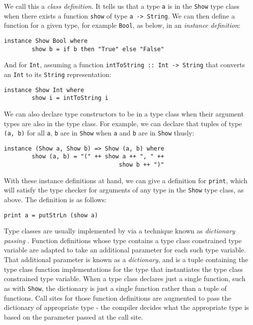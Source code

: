 \noindent We call this a \emph{class definition}. It tells us that a type
\texttt{a} is in the \texttt{Show} type class when there exists a function
\texttt{show} of type \texttt{a -> String}. We can then define a function for a
given type, for example \texttt{Bool}, as below, in an \emph{instance
definition}:
\begin{lstlisting}[mathescape]
    instance Show Bool where
        show b = if b then "True" else "False"
\end{lstlisting}

\noindent And for \texttt{Int}, assuming a function \texttt{intToString :: Int
-> String} that converts an \texttt{Int} to its \texttt{String} representation:
\begin{lstlisting}[mathescape]
    instance Show Int where
        show i = intToString i
\end{lstlisting}

\noindent We can also declare type constructors to be in a type class when their
argument types are also in the type class. For example, we can declare that
tuples of type \texttt{(a, b)} for all \texttt{a}, \texttt{b} are in
\texttt{Show} when \texttt{a} and \texttt{b} are in \texttt{Show} thusly:
\begin{lstlisting}[mathescape]
    instance (Show a, Show b) => Show (a, b) where
        show (a, b) = "(" ++ show a ++ ", " ++
                                 show b ++ ")"
\end{lstlisting}

\noindent With these instance definitions at hand, we can give a definition for
\texttt{print}, which will satisfy the type checker for arguments of any type in
the \texttt{Show} type class, as above. The definition is as follows:
\begin{lstlisting}[mathescape]
    print a = putStrLn (show a)
\end{lstlisting}

Type classes are usually implemented by via a technique known as
\emph{dictionary passing} \cite{K14}. Function definitions whose type contains
a type class constrained type variable are adapted to take an additional
parameter for each such type variable. That additional parameter is known as a
\emph{dictionary}, and is a tuple containing the type class function
implementations for the type that instantiates the type class constrained type
variable. When a type class declares just a single function, such as with
\texttt{Show}, the dictionary is just a single function rather than a tuple of
functions. Call sites for those function definitions are augmented to pass
the dictionary of appropriate type - the compiler decides what the
appropriate type is based on the parameter passed at the call site.

